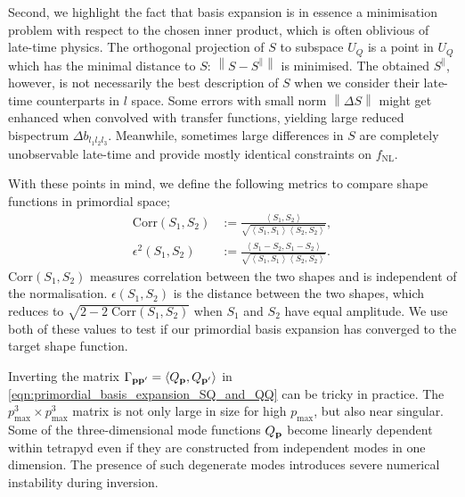 Second, we highlight the fact that basis expansion is in essence a minimisation problem with respect to the chosen inner product, which is often oblivious of late-time physics. The orthogonal projection of $S$ to subspace $U_Q$ is a point in $U_Q$ which has the minimal distance to $S$: $\left\| S - S^\parallel \right\|$ is minimised. The obtained $S^\parallel$, however, is not necessarily the best description of $S$ when we consider their late-time counterparts in $l$ space. Some errors with small norm $\left\| \Delta S \right\|$ might get enhanced when convolved with transfer functions, yielding large reduced bispectrum $\Delta b_{l_1 l_2 l_3}$. Meanwhile, sometimes large differences in $S$ are completely unobservable late-time and provide mostly identical constraints on $f_\text{NL}$.

With these points in mind, we define the following metrics to compare shape functions in primordial space;
\begin{align}
	\text{Corr}(S_1, S_2) &:= \frac{\left< S_1, S_2 \right>}{ \sqrt{ \left< S_1, S_1 \right> \left< S_2, S_2 \right> } }, \\
	\epsilon^2(S_1, S_2) &:= \frac{\left< S_1 - S_2, S_1 - S_2 \right> }{\sqrt{\left< S_1, S_1 \right> \left< S_2, S_2 \right>}}. \label{def:primordial_shape_epsilon}
\end{align}
Corr$(S_1,S_2)$ measures correlation between the two shapes and is independent of the normalisation. $\epsilon(S_1,S_2)$ is the distance between the two shapes, which reduces to $\sqrt{2 - 2\;\text{Corr}(S_1,S_2)}$ when $S_1$ and $S_2$ have equal amplitude. We use both of these values to test if our primordial basis expansion has converged to the target shape function. 

Inverting the matrix $\Gamma_{\mathbf{p} \mathbf{p}'} = \left< Q_\mathbf{p}, Q_{\mathbf{p}'} \right>$ in \eqref{eqn:primordial_basis_expansion_SQ_and_QQ} can be tricky in practice. The $p_\text{max}^3 \times p_\text{max}^3$ matrix is not only large in size for high $p_\text{max}$, but also near singular. Some of the three-dimensional mode functions $Q_\mathbf{p}$ become linearly dependent within tetrapyd even if they are constructed from independent modes in one dimension. The presence of such degenerate modes introduces severe numerical instability during inversion.

